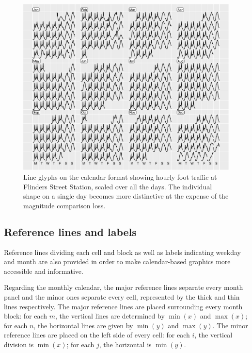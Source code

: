 \documentclass[article]{jss}
\begin{document}
\begin{CodeChunk}
\begin{figure}

{\centering \includegraphics[width=\textwidth]{figure/flinders-free-1} 

}

\caption[Line glyphs on the calendar format showing hourly foot traffic at Flinders Street Station, scaled over all the days]{Line glyphs on the calendar format showing hourly foot traffic at Flinders Street Station, scaled over all the days. The individual shape on a single day becomes more distinctive at the expense of the magnitude comparison loss.}\label{fig:flinders-free}
\end{figure}
\end{CodeChunk}

\subsection{Reference lines and
labels}\label{reference-lines-and-labels}

Reference lines dividing each cell and block as well as labels
indicating weekday and month are also provided in order to make
calendar-based graphics more accessible and informative.

Regarding the monthly calendar, the major reference lines separate every
month panel and the minor ones separate every cell, represented by the
thick and thin lines respectively. The major reference lines are placed
surrounding every month block: for each \(m\), the vertical lines are
determined by \(\min{(x)}\) and \(\max{(x)}\); for each \(n\), the
horizontal lines are given by \(\min{(y)}\) and \(\max{(y)}\). The minor
reference lines are placed on the left side of every cell: for each
\(i\), the vertical division is \(\min{(x)}\); for each \(j\), the
horizontal is \(\min{(y)}\).
\end{document}
